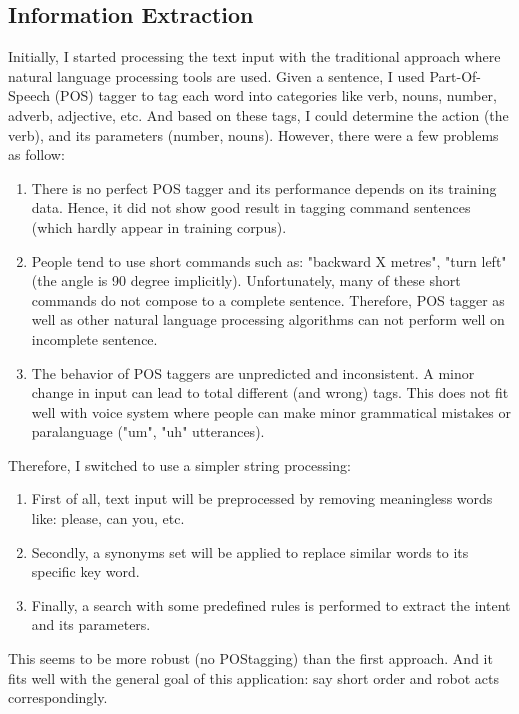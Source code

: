 \subsection{Information Extraction}
Initially, I started processing the text input with the traditional approach where natural language processing tools are used. Given a sentence, I used Part-Of-Speech (POS) tagger to tag each word into categories like verb, nouns, number, adverb, adjective, etc. And based on these tags, I could determine the action (the verb), and its parameters (number, nouns). However, there were a few problems as follow:
\begin{enumerate}
	\item There is no perfect POS tagger and its performance depends on its training data. Hence, it did not show good result in tagging command sentences (which hardly appear in training corpus).
	\item People tend to use short commands such as: "backward X metres", "turn left" (the angle is 90 degree implicitly). Unfortunately, many of these short commands do not compose to a complete sentence. Therefore, POS tagger as well as other natural language processing algorithms can not perform well on incomplete sentence.
	\item The behavior of POS taggers are unpredicted and inconsistent. A minor change in input can lead to total different (and wrong) tags. This does not fit well with voice system where people can make minor grammatical mistakes or paralanguage ("um", "uh" utterances).
\end{enumerate}
Therefore, I switched to use a simpler string processing: 
\begin{enumerate}
	\item First of all, text input will be preprocessed by removing meaningless words like: please, can you, etc.
	\item Secondly, a synonyms set will be applied to replace similar words to its specific key word. 
	\item Finally, a search with some predefined rules is performed to extract the intent and its parameters.
\end{enumerate}
This seems to be more robust (no POStagging) than the first approach. And it fits well with the general goal of this application: say short order and robot acts correspondingly.

